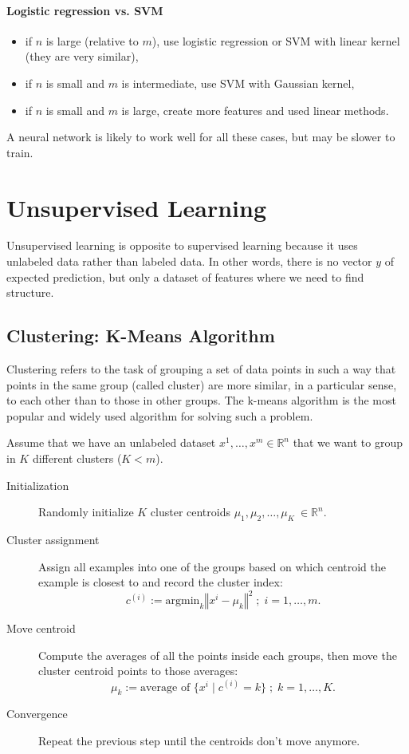 \documentclass[a4paper,11pt]{report}
\newcommand{\norm}[1]{\left\Vert#1\right\Vert}
\begin{document}
\subsubsection*{Logistic regression vs. SVM}

\begin{itemize}
  \item if $n$ is large (relative to $m$), use logistic regression or SVM with linear kernel (they are very similar),
  \item if $n$ is small and $m$ is intermediate, use SVM with Gaussian kernel,
  \item if $n$ is small and $m$ is large, create more features and used linear methods.
\end{itemize}

A neural network is likely to work well for all these cases, but may be slower to train.


\chapter{Unsupervised Learning}

Unsupervised learning is opposite to supervised learning because it uses unlabeled data rather than labeled data. In other words, there is no vector $y$ of expected prediction, but only a dataset of features where we need to find structure.

\section{Clustering: K-Means Algorithm}

Clustering refers to the task of grouping a set of data points in such a way that points in the same group (called cluster) are more similar, in a particular sense, to each other than to those in other groups. The k-means algorithm is the most popular and widely used algorithm for solving such a problem.

Assume that we have an unlabeled dataset $x^1, \ldots, x^m \in \mathbb{R}^n$ that we want to group in $K$ different clusters ($K < m$).

\begin{description}
  \item[Initialization] Randomly initialize $K$ cluster centroids $\mu_1, \mu_2, \ldots, \mu_K\ \in \mathbb{R}^n$.
  \item[Cluster assignment] Assign all examples into one of the groups based on which centroid the example is closest to and record the cluster index:
  $$c^{(i)} := \text{argmin}_{k}{\norm{x^i - \mu_k}^2}\; ; \; i=1,\ldots,m. $$
  \item[Move centroid] Compute the averages of all the points inside each groups, then move the cluster centroid points to those averages:
  $$\mu_k := \text{average of } \{x^i \;|\; c^{(i)} = k\}\; ; \; k=1,\ldots,K.$$
  \item[Convergence] Repeat the previous step until the centroids don't move anymore.
\end{description}
\end{document}
